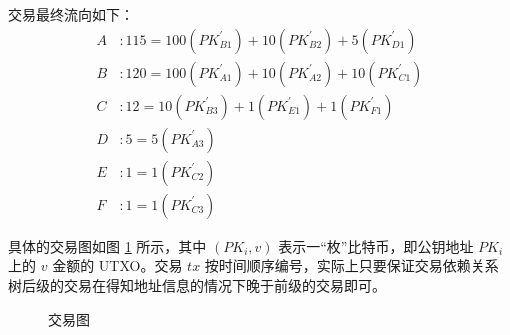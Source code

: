 \documentclass{sjtuarticle}
\def\pk#1{\mathit{PK}_{#1}}
\def\pki#1#2{\mathit{PK}_{#1#2}^\prime}
\begin{document}
交易最终流向如下：
\begin{align*}
    A&: 115 = 100(\pki{B}{1}) + 10(\pki{B}{2}) + 5(\pki{D}{1}) \\
    B&: 120 = 100(\pki{A}{1}) + 10(\pki{A}{2}) + 10(\pki{C}{1}) \\
    C&: 12 = 10(\pki{B}{3}) + 1(\pki{E}{1}) + 1(\pki{F}{1})\\
    D&: 5 = 5(\pki{A}{3}) \\
    E&: 1 = 1(\pki{C}{2}) \\
    F&: 1 = 1(\pki{C}{3})
\end{align*}

具体的交易图如图 \ref{fig:tx} 所示，其中 $(\pk{i},v)$ 表示一“枚”比特币，即公钥地址 $\pk{i}$ 上的 $v$ 金额的 UTXO。交易 $tx$ 按时间顺序编号，实际上只要保证交易依赖关系树后级的交易在得知地址信息的情况下晚于前级的交易即可。
\begin{figure}[h]
    \centering
    
    \caption{交易图}
    \label{fig:tx}
\end{figure}





%
\end{document}
